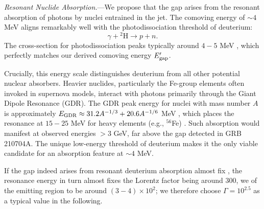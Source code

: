 \documentclass[prd,twocolumn,amsmath,amssymb,aps,linenumbers]{revtex4-2} %
\providecommand{\DIFaddtex}[1]{{\protect\color{blue} \sf #1}} %
\providecommand{\DIFdeltex}[1]{{\protect\color{red} \scriptsize #1}} %
\providecommand{\DIFaddbegin}{} %
\providecommand{\DIFaddend}{} %
\providecommand{\DIFdelbegin}{} %
\providecommand{\DIFdelend}{} %
\providecommand{\DIFadd}[1]{\texorpdfstring{\DIFaddtex{#1}}{#1}} %
\providecommand{\DIFdel}[1]{\texorpdfstring{\DIFdeltex{#1}}{}} %
\newcommand{\DIFscaledelfig}{0.5}
\newlength{\DIFdelgraphicswidth} %
\newlength{\DIFdelgraphicsheight} %
\newcommand{\DIFaddincludegraphics}[2][]{{\color{blue}\fbox{\DIFOincludegraphics[#1]{#2}}}} %
\newcommand{\DIFdelincludegraphics}[2][]{%
\sbox{\DIFdelgraphicsbox}{\DIFOincludegraphics[#1]{#2}}%
\settoboxwidth{\DIFdelgraphicswidth}{\DIFdelgraphicsbox} %
\settoboxtotalheight{\DIFdelgraphicsheight}{\DIFdelgraphicsbox} %
\scalebox{\DIFscaledelfig}{%
\parbox[b]{\DIFdelgraphicswidth}{\usebox{\DIFdelgraphicsbox}\\[-\baselineskip] \rule{\DIFdelgraphicswidth}{0em}}\llap{\resizebox{\DIFdelgraphicswidth}{\DIFdelgraphicsheight}{%
\setlength{\unitlength}{\DIFdelgraphicswidth}%
\begin{picture}(1,1)%
\thicklines\linethickness{2pt} %
{\color[rgb]{1,0,0}\put(0,0){\framebox(1,1){}}}%
{\color[rgb]{1,0,0}\put(0,0){\line( 1,1){1}}}%
{\color[rgb]{1,0,0}\put(0,1){\line(1,-1){1}}}%
\end{picture}%
}\hspace*{3pt}}} %
} %
\DeclareRobustCommand{\DIFaddbegin}{\DIFOaddbegin \let\includegraphics\DIFaddincludegraphics} %
\DeclareRobustCommand{\DIFaddend}{\DIFOaddend \let\includegraphics\DIFOincludegraphics} %
\DeclareRobustCommand{\DIFdelbegin}{\DIFOdelbegin \let\includegraphics\DIFdelincludegraphics} %
\DeclareRobustCommand{\DIFdelend}{\DIFOaddend \let\includegraphics\DIFOincludegraphics} %
\begin{document}
\textit{Resonant Nuclide Absorption.}---We propose that the gap arises from the resonant absorption of photons by nuclei entrained in the jet. The comoving energy of $\sim 4$ MeV aligns remarkably well with the photodissociation threshold of deuterium:
\begin{equation}
\gamma + {^2\text{H}} \rightarrow p + n.
\end{equation}
The cross-section for photodissociation peaks typically around $4-5$ MeV \cite{IAEA2000}, which perfectly matches our derived comoving energy $E_{\rm gap}^{\prime}$.

Crucially, this energy scale distinguishes deuterium from all other potential nuclear absorbers. Heavier nuclides, particularly the Fe-group elements often invoked in supernova models, interact with photons primarily through the Giant Dipole Resonance (GDR). The GDR peak energy for nuclei with mass number $A$ is approximately $E_{\rm GDR} \approx 31.2 A^{-1/3} + 20.6 A^{-1/6}$ MeV \cite{1975RvMP...47..713B}, which places the resonance at $15-25$ MeV for heavy elements (e.g., $^{56}$Fe) \cite{2020NuDS..163..109K}. Such absorption would manifest at observed energies $>3$ GeV, far above the gap detected in GRB 210704A. The unique low-energy threshold of deuterium makes it the only viable candidate for an absorption feature at $\sim 4$ MeV.

If the \DIFaddbegin \DIFadd{gap indeed arises from }\DIFaddend resonant deuterium absorption\DIFdelbegin \DIFdel{almost fix }\DIFdelend \DIFaddbegin \DIFadd{, the resonance energy in turn almost fixes }\DIFaddend the Lorentz factor \DIFdelbegin \DIFdel{being around 300, we }\DIFdelend \DIFaddbegin \DIFadd{of the emitting region to be around $(3-4)\times10^{2}$; we therefore }\DIFaddend choose $\Gamma = 10^{2.5}$ as a typical value in the following.
\end{document}
